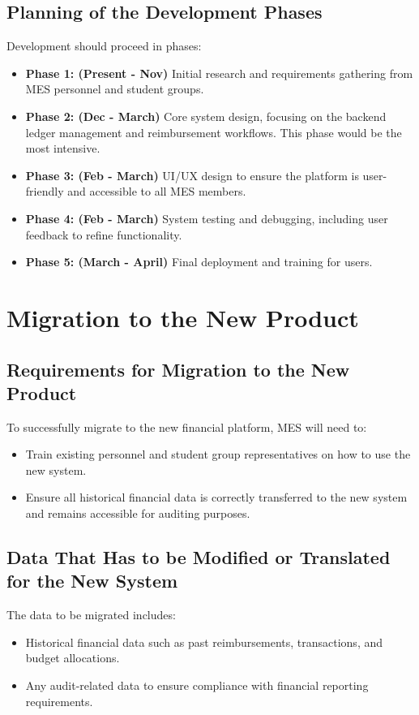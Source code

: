 \documentclass[12pt]{article}
\begin{document}
\subsection{Planning of the Development Phases}
Development should proceed in phases:
\begin{itemize}
    \item \textbf{Phase 1: (Present - Nov)} Initial research and requirements gathering from MES personnel and student groups. 
    \item \textbf{Phase 2: (Dec - March)} Core system design, focusing on the backend ledger management and reimbursement workflows. This phase would be the most intensive.
    \item \textbf{Phase 3: (Feb - March) } UI/UX design to ensure the platform is user-friendly and accessible to all MES members.
    \item \textbf{Phase 4: (Feb - March)} System testing and debugging, including user feedback to refine functionality.
    \item \textbf{Phase 5: (March - April)} Final deployment and training for users.
\end{itemize}

\section{Migration to the New Product}
\subsection{Requirements for Migration to the New Product}
To successfully migrate to the new financial platform, MES will need to:
\begin{itemize}
    \item Train existing personnel and student group representatives on how to use the new system.
    \item Ensure all historical financial data is correctly transferred to the new system and remains accessible for auditing purposes.
\end{itemize}

\subsection{Data That Has to be Modified or Translated for the New System}
The data to be migrated includes:
\begin{itemize}
    \item Historical financial data such as past reimbursements, transactions, and budget allocations.
    \item Any audit-related data to ensure compliance with financial reporting requirements.
\end{itemize}
\end{document}
